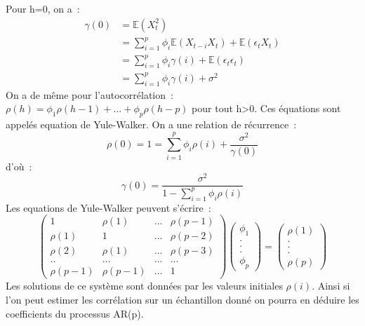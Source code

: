 \documentclass[11pt]{scrartcl} %
\begin{document}
Pour h=0, on a~:
\begin{align*}
\gamma(0)&= \mathbb{E}\left(X_t^2\right)\\
&= \sum_{i=1}^p\phi_i\mathbb{E}\left(X_{t-i}X_{t}\right)+\mathbb{E}\left(\epsilon_tX_{t}\right)\\
&= \sum_{i=1}^p\phi_i\gamma(i)+\mathbb{E}\left(\epsilon_t\epsilon_{t}\right)\\
&=\sum_{i=1}^p\phi_i\gamma(i)+\sigma^2
\end{align*}
On a de même pour l'autocorrélation~:~$\rho(h)=\phi_1\rho(h-1)+...+\phi_p\rho(h-p)$ pour tout h>0.
Ces équations sont appelés equation de Yule-Walker. 
On a une relation de récurrence~:
$$
\rho(0)=1=\sum_{i=1}^p\phi_i\rho(i)+\frac{\sigma^2}{\gamma(0)}
$$
d'où~:
$$
\gamma(0)=\frac{\sigma^2}{1-\sum_{i=1}^p\phi_i\rho(i)}
$$
Les equations de Yule-Walker peuvent s'écrire~:
$$
\left(
\begin{array}{cccc}
1 & \rho(1) & ... & \rho(p-1)\\
\rho(1) & 1 & ... &  \rho(p-2)\\
\rho(2) & \rho(1) & ... & \rho(p-3)\\
.. & ... & ... & ...\\
\rho(p-1) & \rho(p-1) & ... & 1
\end{array}
\right)
\left(
\begin{array}{c}
\phi_1\\
. \\
. \\
.\\
\phi_p
\end{array}
\right)=\left(
\begin{array}{c}
\rho(1)\\
. \\
. \\
.\\
\rho(p)
\end{array}
\right)
$$
Les solutions de ce système sont données par les valeurs initiales $\rho(i)$. Ainsi si l'on peut estimer les corrélation sur un échantillon donné on pourra en déduire les coefficients du processus AR(p).
\end{document}
